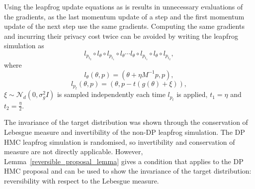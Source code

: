 \documentclass[english,twoside,openright]{HYgraduMLDS}
\newcommand{\caln}{{\mathcal{N}}}
\begin{document}
Using the leapfrog update equations as is results in unnecessary evaluations
of the gradients, as the last momentum update of a step and the first momentum
update of the next step use the same gradients. Computing the same gradients
and incurring their privacy cost
twice can be avoided by writing the leapfrog simulation as
\[
  l_{p_{t_{2}}}\circ l_{\theta}\circ l_{p_{t_{1}}}\circ l_{\theta}\dotsb
  l_{\theta}\circ l_{p_{t_{1}}}\circ l_{\theta}\circ l_{p_{t_{2}}},
\]
where
\[
  l_{\theta}(\theta, p) = (\theta + \eta M^{-1}p, p),
\]
\[
  l_{p_{t}}(\theta, p) = (\theta, p - t(g(\theta) + \xi)),
\]
\(\xi \sim \caln_{d}(0, \sigma_{g}^2I)\) is sampled independently each time
\(l_{p_{t}}\) is applied, \(t_{1} = \eta\) and \(t_{2} = \frac{\eta}{2}\).


%
The invariance of the target distribution was shown through the conservation of
Lebesgue measure and invertibility of the non-DP leapfrog simulation. The
DP HMC leapfrog simulation is randomised, so invertibility and conservation
of measure are not directly applicable. However,
Lemma~\ref{reversible_proposal_lemma} gives a condition that applies to
the DP HMC proposal and can be used to show the invariance of the target
distribution: reversibility with respect to the Lebesgue measure.
\end{document}

